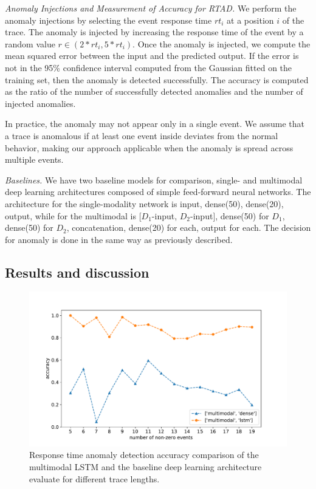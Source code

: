 \emph{Anomaly Injections and Measurement of Accuracy for RTAD.} We perform the anomaly injections by selecting the event response time $rt_i$ at a position $i$ of the trace. The anomaly is injected by increasing the response time of the event by a random value $r \in (2*rt_i, 5*rt_i)$. Once the anomaly is injected, we compute the mean squared error between the input and the predicted output. If the error is not in the 95\% confidence interval computed from the Gaussian fitted on the training set, then the anomaly is detected successfully. 
The accuracy is computed as the ratio of the number of successfully detected anomalies and the number of injected anomalies.

In practice, the anomaly may not appear only in a single event. We assume that a trace is anomalous if at least one event inside deviates from the normal behavior, making our approach applicable when the anomaly is spread across multiple events. 

\emph{Baselines.} We have two baseline models for comparison, single- and multimodal deep learning architectures composed of simple feed-forward neural networks. The architecture for the single-modality network is {input, dense(50), dense(20), output}, while for the multimodal is {[$D_1$-input, $D_2$-input], dense(50) for $D_1$, dense(50) for $D_2$, concatenation, dense(20) for each, output for each}. The decision for anomaly is done in the same way as previously described.

\subsection{Results and discussion}


\begin{figure}[htbp]
\centerline{\includegraphics[width=1.0\textwidth]{gfx/chap5/rtnonzero.pdf}}
\caption{Response time anomaly detection accuracy comparison of the multimodal LSTM and the baseline deep learning architecture evaluate for different trace lengths.}
\label{rtnonzero}
\end{figure}


